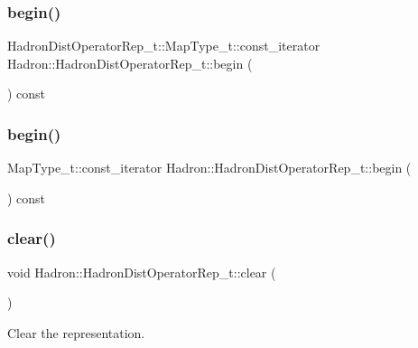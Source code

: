 \subsubsection{\texorpdfstring{begin()}{begin()}\hspace{0.1cm}{\footnotesize\ttfamily [1/2]}}
{\footnotesize\ttfamily Hadron\+Dist\+Operator\+Rep\+\_\+t\+::\+Map\+Type\+\_\+t\+::const\+\_\+iterator Hadron\+::\+Hadron\+Dist\+Operator\+Rep\+\_\+t\+::begin (\begin{DoxyParamCaption}{ }\end{DoxyParamCaption}) const}

\mbox{\label{classHadron_1_1HadronDistOperatorRep__t_af2f649024c217a2e43643a096c7bd512}} 
\subsubsection{\texorpdfstring{begin()}{begin()}\hspace{0.1cm}{\footnotesize\ttfamily [2/2]}}
{\footnotesize\ttfamily Map\+Type\+\_\+t\+::const\+\_\+iterator Hadron\+::\+Hadron\+Dist\+Operator\+Rep\+\_\+t\+::begin (\begin{DoxyParamCaption}{ }\end{DoxyParamCaption}) const}

\mbox{\label{classHadron_1_1HadronDistOperatorRep__t_a8d4c5288c2e0dd19b4af4127eb26a9cd}} 
\subsubsection{\texorpdfstring{clear()}{clear()}\hspace{0.1cm}{\footnotesize\ttfamily [1/2]}}
{\footnotesize\ttfamily void Hadron\+::\+Hadron\+Dist\+Operator\+Rep\+\_\+t\+::clear (\begin{DoxyParamCaption}{ }\end{DoxyParamCaption})}



Clear the representation. 

